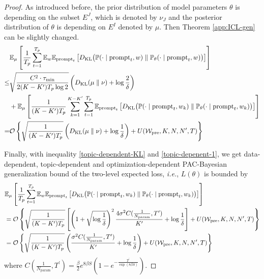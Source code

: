 \begin{proof}
	As introduced before, the prior distribution of model parameters $\theta$ is depending on the subset $E^J$, which is denoted by $\nu_J$ and the posterior distribution of $\theta$ is depending on $E^I$ denoted by $\mu$. Then Theorem \ref{app:ICL-gen} can be slightly changed.
	{\small 
		\begin{align}
			&\mathbb{E}_{\mu}\left[\frac{1}{T_p}\sum_{t=1}^{T_p}\mathbb{E}_{w}\mathbb{E}_{\text{prompt}_{t}}\left[D_{\mathrm{KL}}\big(\mathbb{P}(\cdot\mid \text{prompt}_{t},w)\parallel \mathbb{P}_{\theta}(\cdot\mid \text{prompt}_{t},w)\big)\right]\right]\nonumber\\
			\leq& \sqrt{\frac{C^2\cdot \tau_{\min}}{2(K-K^\prime)T_p \log 2}}\left(D_{\mathrm{KL}}(\mu\parallel \nu)+\log \frac{2}{\delta}\right)\\
			&+\mathbb{E}_\mu\left[\frac{1}{(K-K^\prime)T_p}\sum_{k=1}^{K-K^\prime}\sum_{t=1}^{T_p}\mathbb{E}_{\text{prompt}_{t}}\left[D_{\mathrm{KL}}\big(\mathbb{P}(\cdot\mid \text{prompt}_{t},w_k)\parallel \mathbb{P}_{\theta}(\cdot\mid \text{prompt}_{t},w_k)\big)\right]\right]\nonumber\\
			=&\mathcal{O}\left\{\sqrt{\frac{1}{(K-K^\prime)T_p}}\left(D_{\mathrm{KL}}(\mu\parallel \nu)+\log \frac{1}{\delta}\right)+ U(\mathcal{W}_{\text{pre}},K,N,N^\prime,T)\right\} \label{topic-depenent-1}
		\end{align}
	}
	
	Finally, with inequality \ref{topic-dependent-KL} and \ref{topic-depenent-1}, we get data-dependent, topic-dependent and optimization-dependent PAC-Bayesian generalization bound of the two-level expected loss, \emph{i.e.}, $L(\theta)$ is bounded by
	\begin{align}
		&\mathbb{E}_{\mu}\left[\frac{1}{T_p}\sum_{t=1}^{T_p}\mathbb{E}_{w}\mathbb{E}_{\text{prompt}_t}\left[D_{\mathrm{KL}}\big(\mathbb{P}(\cdot\mid \text{prompt}_t,w_k)\parallel \mathbb{P}_{\theta}(\cdot\mid \text{prompt}_t,w_k)\big)\right]\right]\nonumber\\
		&=\mathcal{O}\left\{\sqrt{\frac{1}{(K-K^\prime)T_p}}\left[\left(1+\sqrt{\log \frac{1}{\delta}}\right)^2 \frac{4\sigma^2C(\frac{1}{N_{\text{param}}},{T^\prime})}{K^\prime}+\log \frac{1}{\delta}\right]+ U(\mathcal{W}_{\text{pre}},K,N,N^\prime,T)\right\}\nonumber\\
        &=\mathcal{O}\left\{\sqrt{\frac{1}{(K-K^\prime)T_p}}\left(\frac{\sigma^2C(\frac{1}{N_{\text{param}}},{T^\prime})}{K^\prime}+\log \frac{1}{\delta}\right)+ U(\mathcal{W}_{\text{pre}},K,N,N^\prime,T)\right\}
	\end{align}
	where $C(\frac{1}{N_{\text{param}}},T^\prime)=\frac{\beta}{2}e^{8\beta S}\left(1-e^{-\frac{ T^\prime}{\exp(8\beta S)}}\right)$.
\end{proof}